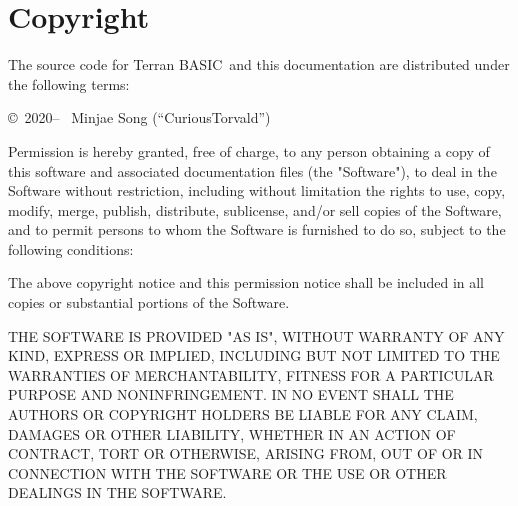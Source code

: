\documentclass[10pt, stock, openany, chapter]{memoir}
\newcommand{\tbas}{Terran BASIC}
\begin{document}
\chapter{Copyright}

The source code for \tbas\ and this documentation are distributed under the following terms:

\copyright\ 2020-- \ Minjae Song (``CuriousTorvald'')

Permission is hereby granted, free of charge, to any person obtaining a copy
of this software and associated documentation files (the "Software"), to deal
in the Software without restriction, including without limitation the rights
to use, copy, modify, merge, publish, distribute, sublicense, and/or sell
copies of the Software, and to permit persons to whom the Software is
furnished to do so, subject to the following conditions:

The above copyright notice and this permission notice shall be included in all
copies or substantial portions of the Software.

THE SOFTWARE IS PROVIDED "AS IS", WITHOUT WARRANTY OF ANY KIND, EXPRESS OR
IMPLIED, INCLUDING BUT NOT LIMITED TO THE WARRANTIES OF MERCHANTABILITY,
FITNESS FOR A PARTICULAR PURPOSE AND NONINFRINGEMENT. IN NO EVENT SHALL THE
AUTHORS OR COPYRIGHT HOLDERS BE LIABLE FOR ANY CLAIM, DAMAGES OR OTHER
LIABILITY, WHETHER IN AN ACTION OF CONTRACT, TORT OR OTHERWISE, ARISING FROM,
OUT OF OR IN CONNECTION WITH THE SOFTWARE OR THE USE OR OTHER DEALINGS IN THE
SOFTWARE.

\afterpage{\pagestyle{empty}\null\newpage}
\end{document}
